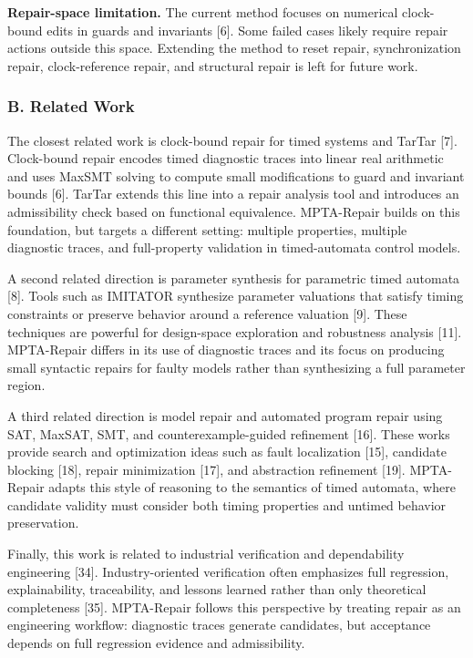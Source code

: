 \documentclass[
]{article}
\begin{document}
\textbf{Repair-space limitation.} The current method focuses on
numerical clock-bound edits in guards and invariants {[}6{]}. Some
failed cases likely require repair actions outside this space. Extending
the method to reset repair, synchronization repair, clock-reference
repair, and structural repair is left for future work.

\subsubsection{B. Related Work}\label{b.-related-work}

The closest related work is clock-bound repair for timed systems and
TarTar {[}7{]}. Clock-bound repair encodes timed diagnostic traces into
linear real arithmetic and uses MaxSMT solving to compute small
modifications to guard and invariant bounds {[}6{]}. TarTar extends this
line into a repair analysis tool and introduces an admissibility check
based on functional equivalence. MPTA-Repair builds on this foundation,
but targets a different setting: multiple properties, multiple
diagnostic traces, and full-property validation in timed-automata
control models.

A second related direction is parameter synthesis for parametric timed
automata {[}8{]}. Tools such as IMITATOR synthesize parameter valuations
that satisfy timing constraints or preserve behavior around a reference
valuation {[}9{]}. These techniques are powerful for design-space
exploration and robustness analysis {[}11{]}. MPTA-Repair differs in its
use of diagnostic traces and its focus on producing small syntactic
repairs for faulty models rather than synthesizing a full parameter
region.

A third related direction is model repair and automated program repair
using SAT, MaxSAT, SMT, and counterexample-guided refinement {[}16{]}.
These works provide search and optimization ideas such as fault
localization {[}15{]}, candidate blocking {[}18{]}, repair minimization
{[}17{]}, and abstraction refinement {[}19{]}. MPTA-Repair adapts this
style of reasoning to the semantics of timed automata, where candidate
validity must consider both timing properties and untimed behavior
preservation.

Finally, this work is related to industrial verification and
dependability engineering {[}34{]}. Industry-oriented verification often
emphasizes full regression, explainability, traceability, and lessons
learned rather than only theoretical completeness {[}35{]}. MPTA-Repair
follows this perspective by treating repair as an engineering workflow:
diagnostic traces generate candidates, but acceptance depends on full
regression evidence and admissibility.
\end{document}
